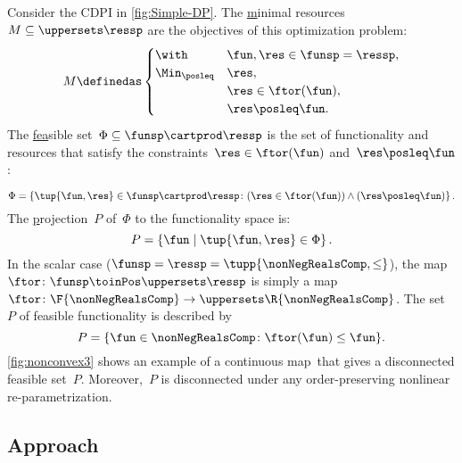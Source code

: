 \begin{example}
    \label{exa:one}
    Consider the CDPI in \cref{fig:Simple-DP}.
    The \uline{m}inimal resources~$M\subseteq\uppersets \ressp$ are the objectives of this optimization problem:
    \begin{equation*}
        M\definedas\begin{cases}
            \with          & \fun,\res\in\funsp=\ressp, \\
            \Min_{\posleq} & \res,                      \\
                           & \res\in\ftor(\fun),        \\
                           & \res\posleq\fun.           
        \end{cases}
    \end{equation*}
    The \uline{fea}sible set~$\Phi\subseteq\funsp\cartprod\ressp$ is the set of functionality and resources that satisfy the constraints~$\res\in\ftor(\fun)$ and~$\res\posleq\fun$:

    \begin{equation}
        \Phi=\left\{ \tup{\fun,\res}\in\funsp\cartprod\ressp\colon (\res\in\ftor(\fun))\wedge(\res\posleq\fun)\right\} .\label{eq:feasible}
    \end{equation}
    The \uline{p}rojection~$P$ of~$\Phi$ to the functionality space is:
    \begin{equation*}
        P=\left\{ \fun\mid\tup{\fun,\res} \in\Phi\right\}.
    \end{equation*}
    In the scalar case ($\funsp=\ressp=\tupp{\nonNegRealsComp,\leq}$), the map~$\ftor\colon\funsp\toinPos\uppersets \ressp$ is simply a map~$\ftor\colon\F{\nonNegRealsComp}\to \uppersets\R{\nonNegRealsComp}$.
    The set~$P$ of feasible functionality is described by
    \begin{equation}
        P=\{\fun\in\nonNegRealsComp\colon \ftor(\fun)\leq\fun\}.\label{eq:Pfeasible}
    \end{equation}
    \cref{fig:nonconvex3} shows an example of a continuous map~\ftor that gives a disconnected feasible set~$P$.
    Moreover,~$P$ is disconnected under any order-preserving nonlinear re-parametrization.

\end{example}

\subsection{Approach}


